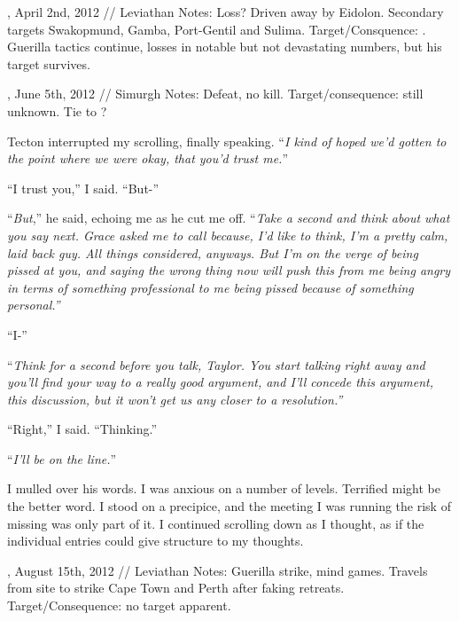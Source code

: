 , April 2nd, 2012 // Leviathan
Notes:  Loss?  Driven away by Eidolon.  Secondary targets Swakopmund, Gamba, Port-Gentil and Sulima.
Target/Consquence: \underline{}.  Guerilla tactics continue, losses in notable but not devastating numbers, but his target survives.



, June 5th, 2012 // Simurgh
Notes: Defeat, no kill.
Target/consequence: still unknown.  Tie to \underline{}\underline{\strong{ }}?



Tecton interrupted my scrolling, finally speaking.  ``\emph{I kind of hoped we'd gotten to the point where we were okay, that you'd trust me.}''



``I trust you,'' I said.  ``But-''



``\emph{But},'' he said, echoing me as he cut me off.  ``\emph{Take a second and think about what you say next.  Grace asked me to call because, I'd like to think, I'm a pretty calm, laid back guy.  All things considered, anyways.  But I'm on the verge of being pissed at you, and saying the wrong thing now will push this from me being angry in terms of something professional to me being pissed because of something personal.''}



``I-''



``\emph{Think for a second before you talk, Taylor.  You start talking right away and you'll find your way to a really good argument, and I'll concede this argument, this discussion, but it won't get us any closer to a resolution.''}



``Right,'' I said.  ``Thinking.''



``\emph{I'll be on the line.}''



I mulled over his words.  I was anxious on a number of levels.  Terrified might be the better word.  I stood on a precipice, and the meeting I was running the risk of missing was only part of it.  I continued scrolling down as I thought, as if the individual entries could give structure to my thoughts.



, August 15th, 2012 // Leviathan
Notes: Guerilla strike, mind games.  Travels from site to strike Cape Town and Perth after faking retreats.
Target/Consequence: no target apparent.



